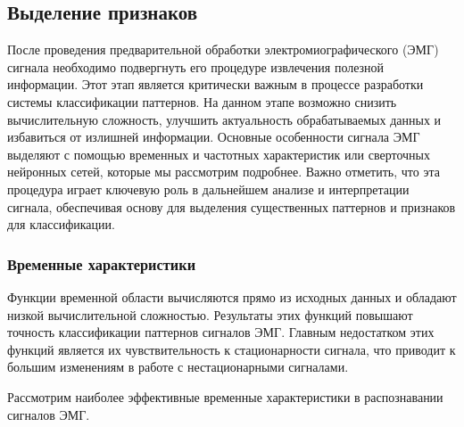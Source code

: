 \subsection{Выделение признаков}

После проведения предварительной обработки электромиографического (ЭМГ) сигнала необходимо подвергнуть его процедуре извлечения полезной информации. Этот этап является критически важным в процессе разработки системы классификации паттернов. На данном этапе возможно снизить вычислительную сложность, улучшить актуальность обрабатываемых данных и избавиться от излишней информации. Основные особенности сигнала ЭМГ выделяют с помощью временных и частотных характеристик или сверточных нейронных сетей, которые мы рассмотрим подробнее. Важно отметить, что эта процедура играет ключевую роль в дальнейшем анализе и интерпретации сигнала, обеспечивая основу для выделения существенных паттернов и признаков для классификации.

\subsubsection{Временные характеристики}

Функции временной области вычисляются прямо из исходных данных и обладают низкой вычислительной сложностью. Результаты этих функций повышают точность классификации паттернов сигналов ЭМГ. Главным недостатком этих функций является их чувствительность к стационарности сигнала, что приводит к большим изменениям в работе с нестационарными сигналами.

Рассмотрим наиболее эффективные временные характеристики в распознавании сигналов ЭМГ.

